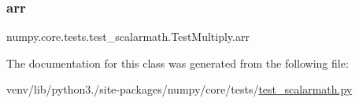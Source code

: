 \subsubsection{\texorpdfstring{arr}{arr}}
{\footnotesize\ttfamily numpy.\+core.\+tests.\+test\+\_\+scalarmath.\+Test\+Multiply.\+arr}



The documentation for this class was generated from the following file\+:\begin{DoxyCompactItemize}
\item 
venv/lib/python3./site-\/packages/numpy/core/tests/\hyperlink{test__scalarmath_8py}{test\+\_\+scalarmath.\+py}\end{DoxyCompactItemize}
